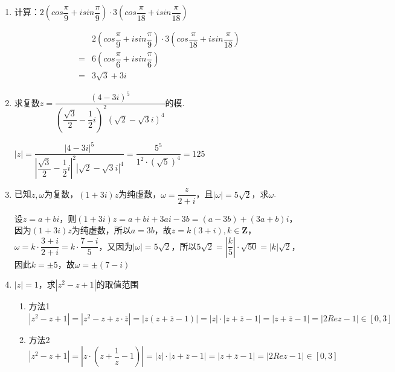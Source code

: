 \begin{enumerate}
    \item 计算：$2\left(cos\dfrac{\pi}{9}+isin\dfrac{\pi}{9}\right) \cdot 3\left(cos\dfrac{\pi}{18} + i sin\dfrac{\pi}{18}\right)$
    \begin{jieda}
        \begin{align*}
            & 2\left(cos\dfrac{\pi}{9}+isin\dfrac{\pi}{9}\right) \cdot 3\left(cos\dfrac{\pi}{18} + i sin\dfrac{\pi}{18}\right) \\
            = & 6 \left(cos\dfrac{\pi}{6} + i sin\dfrac{\pi}{6}\right) \\
            = & 3\sqrt{3} + 3i
        \end{align*}
    \end{jieda}
    \item 求复数$z = \dfrac{(4-3i)^5}{\left(\dfrac{\sqrt{3}}{2} - \dfrac{1}{2}i\right)^2(\sqrt{2}-\sqrt{3}i)^4}$的模.
    \begin{jieda}
        $|z| = \dfrac{|4-3i|^5}{\left|\dfrac{\sqrt{3}}{2} - \dfrac{1}{2}i\right|^2|\sqrt{2}-\sqrt{3}i|^4} = \dfrac{5^5}{1^2 \cdot (\sqrt{5})^4} = 125$
    \end{jieda}
    \item 已知$z, \omega$为复数，$(1+3i)z$为纯虚数，$\omega = \dfrac{z}{2+i}$，且$|\omega| = 5\sqrt{2}$，求$\omega$.
    \begin{jieda}
        设$z = a+bi$，则$(1+3i)z = a+bi + 3ai - 3b = (a-3b) + (3a+b)i$，因为$(1+3i)z$为纯虚数，所以$a = 3b$，故$z = k(3+i), k \in \mathbf{Z}$，$\omega = k \cdot \dfrac{3+i}{2+i} = k \cdot \dfrac{7-i}{5}$，又因为$|\omega| = 5\sqrt{2}$，所以$5\sqrt{2} = \left|\dfrac{k}{5}\right| \cdot \sqrt{50} = |k| \sqrt{2}$，因此$k = \pm 5$，故$\omega = \pm (7-i)$
    \end{jieda}
    \item $|z| = 1$，求$|z^2-z+1|$的取值范围
    \begin{jieda}
        \begin{enumerate}
            \item 方法1 \\
            $|z^2-z+1| = |z^2-z+z\cdot \overline{z}| = |z(z + \overline{z} - 1)| = |z| \cdot |z + \overline{z}-1| = |z + \overline{z}-1| = |2Re z - 1| \in [0, 3]$
            \item 方法2 \\
            $|z^2-z+1| = \left|z \cdot \left(z+\dfrac{1}{z} - 1\right)\right| = |z| \cdot |z + \overline{z}-1| = |z + \overline{z}-1| = |2Re z - 1| \in [0, 3]$
        \end{enumerate}

\end{jieda}
\end{enumerate}
